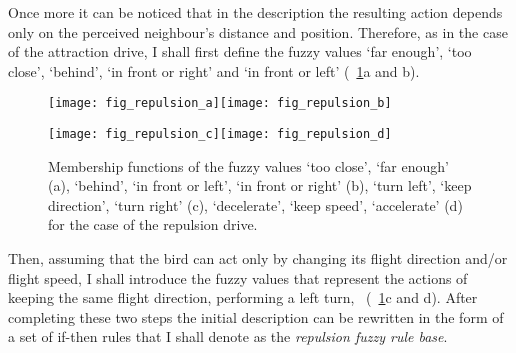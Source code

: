 Once more it can be noticed that in the description the resulting action depends only on the perceived neighbour's distance and position. Therefore, as in the case of the attraction drive, I shall first define the fuzzy values `far enough', `too close', `behind', `in front or right' and `in front or left' (\figs~\ref{fig:fuzzyAnimat:Dr:afd}a and b).
%
\begin{figure}
  \null\vspace*{2mm}\par
  \texttt{[image: fig\_repulsion\_a]}\hspace*{2mm}\texttt{[image: fig\_repulsion\_b]}
  \par\vspace*{2mm}
  \texttt{[image: fig\_repulsion\_c]}\hspace*{2mm}\texttt{[image: fig\_repulsion\_d]}
  \par\vspace*{2mm}
  \caption{Membership functions of the fuzzy values `too close', `far enough' (a), `behind', `in front or left', `in front or right' (b), `turn left', `keep direction', `turn right' (c), `decelerate', `keep speed', `accelerate' (d) for the case of the repulsion drive.}
  \label{fig:fuzzyAnimat:Dr:afd}
\end{figure}
%
Then, assuming that the bird can act only by changing its flight direction and/or flight speed, I shall introduce the fuzzy values that represent the actions of keeping the same flight direction, performing a left turn, \etc\ (\figs~\ref{fig:fuzzyAnimat:Dr:afd}c and d). After completing these two steps the initial description can be rewritten in the form of a set of if-then rules that I shall denote as the \emph{repulsion fuzzy rule base}.

